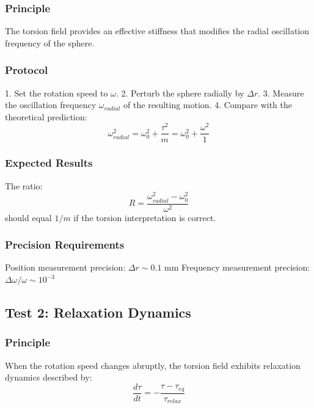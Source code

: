 \documentclass[UTF8]{ctex}\n\documentclass[12pt,a4paper]{article}
\begin{document}
\subsubsection{Principle}

The torsion field provides an effective stiffness that modifies the radial oscillation frequency of the sphere.

\subsubsection{Protocol}

1. Set the rotation speed to $\omega$.
2. Perturb the sphere radially by $\Delta r$.
3. Measure the oscillation frequency $\omega_{radial}$ of the resulting motion.
4. Compare with the theoretical prediction:
\begin{equation}
    \omega_{radial}^2 = \omega_0^2 + \frac{\tau^2}{m} = \omega_0^2 + \frac{\omega^2}{1}
\end{equation}

\subsubsection{Expected Results}

The ratio:
\begin{equation}
    R = \frac{\omega_{radial}^2 - \omega_0^2}{\omega^2}
\end{equation}
should equal $1/m$ if the torsion interpretation is correct.

\subsubsection{Precision Requirements}

Position measurement precision: $\Delta r \sim 0.1$ mm  
Frequency measurement precision: $\Delta\omega/\omega \sim 10^{-3}$

\subsection{Test 2: Relaxation Dynamics}

\subsubsection{Principle}

When the rotation speed changes abruptly, the torsion field exhibits relaxation dynamics described by:
\begin{equation}
    \frac{d\tau}{dt} = -\frac{\tau - \tau_{eq}}{\tau_{relax}}
\end{equation}
\end{document}
